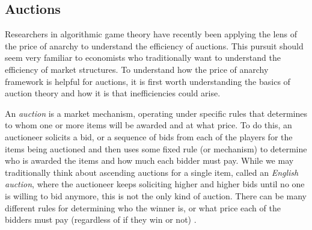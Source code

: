 \documentclass[12pt,twoside]{reedthesis}
\begin{document}
\subsection{Auctions}
Researchers in algorithmic game theory have recently been applying the lens of the price of anarchy to understand the efficiency of auctions. This pursuit should seem very familiar to economists who traditionally want to understand the efficiency of market structures. To understand how the price of anarchy framework is helpful for auctions, it is first worth understanding the basics of auction theory and how it is that inefficiencies could arise. 

An \textit{auction} is a market mechanism, operating under specific rules that determines to whom one or more items will be awarded and at what price. To do this, an auctioneer solicits a bid, or a sequence of bids from each of the players for the items being auctioned and then uses some fixed rule (or mechanism) to determine who is awarded the items and how much each bidder must pay. While we may traditionally think about ascending auctions for a single item, called an {\em English auction}, where the auctioneer keeps soliciting higher and higher bids until no one is willing to bid anymore, this is not the only kind of auction. There can be many different rules for determining who the winner is, or what price each of the bidders must pay (regardless of if they win or not) \citep{Mochon2015}.
\end{document}
